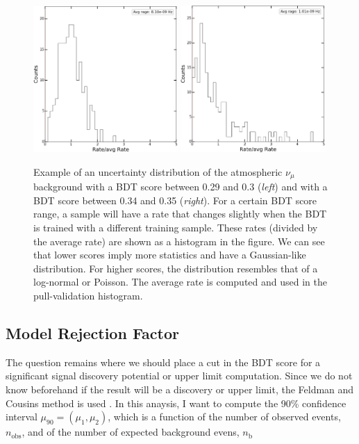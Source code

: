 \begin{figure}
\centering
\includegraphics[width=0.49\textwidth]{chapter8/img/PMF_test_numu_atmos_bg_betweenbin_0p29_0p3_crop.png}
\includegraphics[width=0.49\textwidth]{chapter8/img/PMF_test_numu_atmos_bg_betweenbin_0p34_0p35_crop.png}
\caption{Example of an uncertainty distribution of the atmospheric $\nu_\mu$ background with a BDT score between 0.29 and 0.3 (\textit{left}) and with a BDT score between 0.34 and 0.35 (\textit{right}). For a certain BDT score range, a sample will have a rate that changes slightly when the BDT is trained with a different training sample. These rates (divided by the average rate) are shown as a histogram in the figure. We can see that lower scores imply more statistics and have a Gaussian-like distribution. For higher scores, the distribution resembles that of a log-normal or Poisson. The average rate is computed and used in the pull-validation histogram.}
\label{fig:betweenbins}
\end{figure}


\subsection{Model Rejection Factor}
\label{subsec:mrf}
The question remains where we should place a cut in the BDT score for a significant signal discovery potential or upper limit computation. Since we do not know beforehand if the result will be a discovery or upper limit, the Feldman and Cousins method is used \cite{Feldman:1997qc}. In this anaysis, I want to compute the 90\% confidence interval $\mu_{90} = (\mu_1, \mu_2)$, which is a function of the number of observed events, $n_\textrm{obs}$, and of the number of expected background evens, $n_\textrm{b}$

